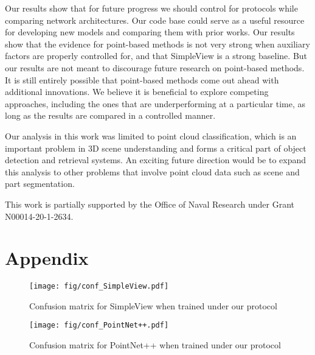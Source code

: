 \documentclass{article}
\newcommand{\smallsec}[1]{\noindent {\bf #1:}}
\begin{document}
Our results show that for future progress we should control for protocols while comparing network architectures. Our code base could serve as a useful resource for developing new models and comparing them with prior works. Our results show that the evidence for point-based methods is not very strong when auxiliary factors are properly controlled for, and that SimpleView is a strong baseline. But our results are not meant to discourage future research on point-based methods. It is still entirely possible that point-based methods come out ahead with additional innovations. We believe it is beneficial to explore competing approaches, including the ones that are underperforming at a particular time,  as long as the results are compared in a controlled manner. 

Our analysis in this work was limited to point cloud classification, which is an important problem in 3D scene understanding and forms a critical part of object detection and retrieval systems. An exciting future direction would be to expand this analysis to other problems that involve point cloud data such as scene and part segmentation.

\smallsec{Acknowledgement} This work is partially supported by the Office of Naval Research under Grant N00014-20-1-2634.

\appendix
\section{Appendix}
\label{appendix}
\setcounter{figure}{0}
\renewcommand\thefigure{\Roman{figure}}
\setcounter{table}{0}
\renewcommand\thetable{\Roman{table}}
\begin{figure}[h]
    \texttt{[image: fig/conf\_SimpleView.pdf]}
    \caption{Confusion matrix for SimpleView when trained under our protocol}
    \label{fig:confusion_simpleview}
\end{figure}
\begin{figure}[h]
    \texttt{[image: fig/conf\_PointNet++.pdf]}
    \caption{Confusion matrix for PointNet++ when trained under our protocol}
    \label{fig:confusion_pointnet++}
\end{figure}
\appendix




\end{document}

